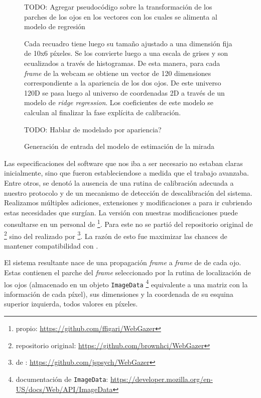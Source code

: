 \begin{figure}
  TODO: Agregar pseudocódigo sobre la transformación de los parches de los ojos
        en los vectores con los cuales se alimenta al modelo de regresión

Cada recuadro tiene luego su tamaño ajustado a una dimensión fija de 10x6
píxeles.
Se los convierte luego a una escala de grises y son ecualizados a través de
histogramas.
De esta manera, para cada \textit{frame} de la webcam se obtiene un vector de
120 dimensiones correspondiente a la apariencia de los dos ojos.
De este universo 120D se pasa luego al universo de coordenadas 2D a través de
un modelo de \textit{ridge regression}.
Los coeficientes de este modelo se calculan al finalizar la fase explícita de
calibración.

  TODO: Hablar de modelado por apariencia?

  \caption{Generación de entrada del modelo de estimación de la mirada}
  \label{fig:eye-features-to-model-input}
\end{figure}

Las especificaciones del software que nos iba a ser necesario no estaban claras
inicialmente, sino que fueron estableciendose a medida que el trabajo avanzaba.
Entre otros, se denotó la ausencia de una rutina de calibración adecuada a
nuestro protocolo y de un mecanismo de detección de descalibración del sistema.
Realizamos múltiples adiciones, extensiones y modificaciones a \webgazer para
ir cubriendo estas necesidades que surgían.
La versión con nuestras modificaciones puede consultarse en un \fork
personal de \webgazer \footnote{\fork propio:
\url{https://github.com/ffigari/WebGazer}}.
Para este \fork no se partió del repositorio original de \webgazer
\footnote{repositorio original: \url{https://github.com/brownhci/WebGazer}}
sino del \fork realizado por \jspsych \footnote{\fork de \jspsych:
\url{https://github.com/jspsych/WebGazer}}.
La razón de esto fue maximizar las chances de mantener compatibilidad con
\jspsych.

El sistema resultante nace de una propagación \textit{frame} a \textit{frame}
de \features de cada ojo.
Estas contienen el parche del \textit{frame} seleccionado por la rutina de
localización de los ojos (almacenado en un objeto \texttt{ImageData}
\footnote{documentación de \texttt{ImageData}:
\url{https://developer.mozilla.org/en-US/docs/Web/API/ImageData}} equivalente a
una matriz con la información de cada píxel), sus dimensiones y la coordenada
de su esquina superior izquierda, todos valores en píxeles.


